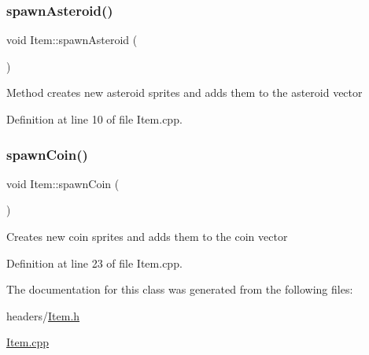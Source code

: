\subsubsection{\texorpdfstring{spawnAsteroid()}{spawnAsteroid()}}
{\footnotesize\ttfamily void Item\+::spawn\+Asteroid (\begin{DoxyParamCaption}{ }\end{DoxyParamCaption})}

Method creates new asteroid sprites and adds them to the asteroid vector 

Definition at line 10 of file Item.\+cpp.

\mbox{\label{class_item_ad79f9b2e0ad9cb922cd7678fc8dc628e}} 
\subsubsection{\texorpdfstring{spawnCoin()}{spawnCoin()}}
{\footnotesize\ttfamily void Item\+::spawn\+Coin (\begin{DoxyParamCaption}{ }\end{DoxyParamCaption})}

Creates new coin sprites and adds them to the coin vector 

Definition at line 23 of file Item.\+cpp.



The documentation for this class was generated from the following files\+:\begin{DoxyCompactItemize}
\item 
headers/\mbox{\hyperlink{_item_8h}{Item.\+h}}\item 
\mbox{\hyperlink{_item_8cpp}{Item.\+cpp}}\end{DoxyCompactItemize}
